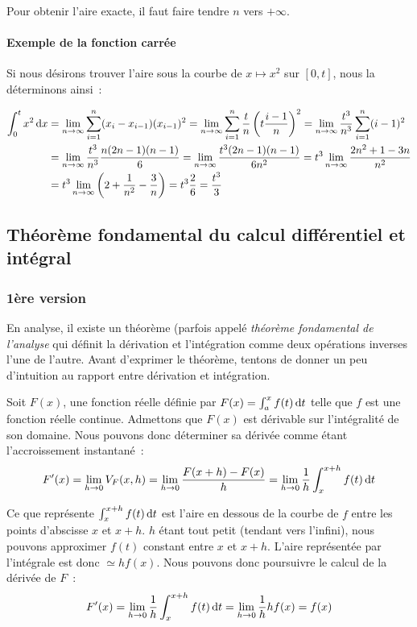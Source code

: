 \documentclass{article}
\theoremstyle{definition}
\theoremstyle{remark}
\begin{document}
			Pour obtenir l'aire exacte, il faut faire tendre $n$ vers $+\infty$.

			\paragraph{Exemple de la fonction carrée}
				Si nous désirons trouver l'aire sous la courbe de $x \mapsto x^2$ sur $[0, t]$, nous la déterminons ainsi~:

				\[\begin{aligned}
					\int_0^tx^2\dif x &= \lim_{n \to \infty}\sum_{i=1}^n(x_i-x_{i-1})(x_{i-1})^2 = \lim_{n \to \infty}\sum_{i=1}^n\frac tn\left(t\frac {i-1}{n}\right)^2 =
					\lim_{n \to \infty}\frac {t^3}{n^3}\sum_{i=1}^n(i-1)^2 \\
									  &= \lim_{n \to \infty}\frac {t^3}{n^3}\frac {n(2n-1)(n-1)}{6} = \lim_{n \to \infty}\frac {t^3(2n-1)(n-1)}{6n^2} =
					t^3\lim_{n \to \infty}\frac {2n^2 + 1 - 3n}{n^2} \\
									  &= t^3\lim_{n \to \infty}\left(2 + \frac {1}{n^2} - \frac 3n\right) = t^3\frac 26 = \frac {t^3}{3}
				\end{aligned}\]

	\subsection{Théorème fondamental du calcul différentiel et intégral}
		\subsubsection{1ère version}
				En analyse, il existe un théorème (parfois appelé \textit{théorème fondamental de l'analyse} qui définit la dérivation et l'intégration
				comme deux opérations inverses l'une de l'autre. Avant d'exprimer le théorème, tentons de donner un peu d'intuition au rapport
				entre dérivation et intégration.

				Soit $F(x)$, une fonction réelle définie par $F(x) = \int_a^xf(t)\dif t$ telle que $f$ est une fonction réelle continue. Admettons que
				$F(x)$ est dérivable sur l'intégralité de son domaine. Nous pouvons donc déterminer sa dérivée comme étant l'accroissement instantané~:
				\[F'(x) = \lim_{h \to 0}V_F(x, h) = \lim_{h \to 0}\frac {F(x+h) - F(x)}{h} = \lim_{h \to 0} \frac 1h\int_x^{x+h}f(t)\dif t\]

				Ce que représente $\int_x^{x+h}f(t)\dif t$ est l'aire en dessous de la courbe de $f$ entre les points d'abscisse $x$ et $x+h$.
				$h$ étant tout petit (tendant vers l'infini), nous pouvons approximer $f(t)$ constant entre $x$ et $x+h$. L'aire représentée par
				l'intégrale est donc $\simeq hf(x)$. Nous pouvons donc poursuivre le calcul de la dérivée de $F$~:
				\[F'(x) = \lim_{h \to 0} \frac 1h\int_x^{x+h}f(t)\dif t = \lim_{h \to 0} \frac 1hhf(x) = f(x)\]
\end{document}

